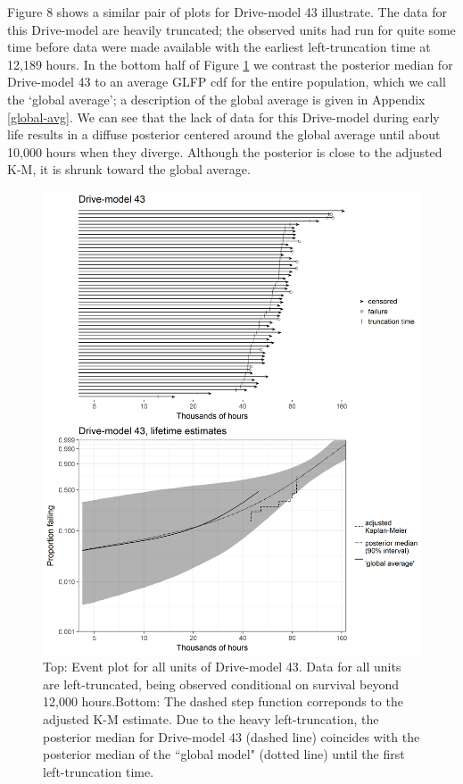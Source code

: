 \documentclass[aoas]{imsart}
\begin{document}
Figure 8 shows a similar pair of plots for Drive-model 43 illustrate. The data for this Drive-model are heavily truncated; the observed units had run for quite some time before data were made available with the earliest left-truncation time at 12,189 hours. In the bottom half of Figure \ref{fig:ex-mod-43} we contrast the posterior median for Drive-model 43 to an average GLFP cdf for the entire population, which we call the `global average'; a description of the global average is given in Appendix \ref{global-avg}. We can see that the lack of data for this Drive-model during early life results in a diffuse posterior centered around the global average until about 10,000 hours when they diverge. Although the posterior is close to the adjusted K-M, it is shrunk toward the global average.


\begin{figure}
\centering
\includegraphics[height=.8\textheight]{dm43-shrinkage.png}
\caption{\footnotesize Top: Event plot for all units of Drive-model 43. Data for all units are left-truncated, being observed conditional on survival beyond 12,000 hours.\hspace{\textwidth}Bottom: The dashed step function correponds to the adjusted K-M estimate. Due to the heavy left-truncation, the posterior median for Drive-model 43 (dashed line) coincides with the posterior median of the ``global model" (dotted line) until the first left-truncation time.}
\label{fig:ex-mod-43}
\end{figure}
\end{document}
